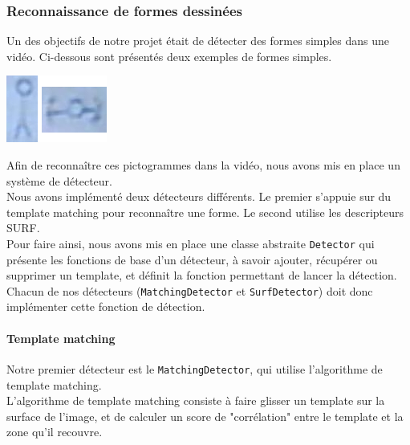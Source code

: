 \subsubsection{Reconnaissance de formes dessinées}

Un des objectifs de notre projet était de détecter des formes simples dans une vidéo. Ci-dessous sont présentés deux exemples de formes simples.\\

\begin{center}
\includegraphics[scale=1]{images/templates.png}
\end{center}

Afin de reconnaître ces pictogrammes dans la vidéo, nous avons mis en place un système de détecteur.\\

Nous avons implémenté deux détecteurs différents. Le premier s'appuie sur du template matching pour reconnaître une forme. Le second utilise les descripteurs SURF.\\

Pour faire ainsi, nous avons mis en place une classe abstraite \texttt{Detector} qui présente les fonctions de base d'un détecteur, à savoir ajouter, récupérer ou supprimer un template, et définit la fonction permettant de lancer la détection.
Chacun de nos détecteurs (\texttt{MatchingDetector} et \texttt{SurfDetector}) doit donc implémenter cette fonction de détection.

\paragraph{Template matching \cite{Matching1} \cite{Matching2}\vspace{0.5cm}\\}

Notre premier détecteur est le \texttt{MatchingDetector}, qui utilise l'algorithme de template matching.\\

L'algorithme de template matching consiste à faire glisser un template sur la surface de l'image, et de calculer un score de "corrélation" entre le template et la zone qu'il recouvre.\\

